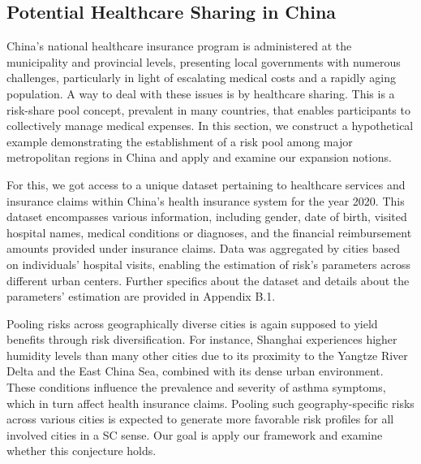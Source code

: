 \documentclass[fleqn,mnsc,nonblindrev]{informs4}
\begin{document}

\subsection{Potential Healthcare Sharing in China}

China's national healthcare insurance program is administered at the municipality and provincial levels, presenting local governments with numerous challenges, particularly in light of escalating medical costs and a rapidly aging population. A way to deal with these issues is by healthcare sharing. This is a risk-share pool concept, prevalent in many countries, that enables participants to collectively manage medical expenses. In this section, we construct a hypothetical example demonstrating the establishment of a risk pool among major metropolitan regions in China and apply and examine our expansion notions.  

For this, we got access to a unique dataset pertaining to healthcare services and insurance claims within China’s health insurance system for the year 2020. This dataset encompasses various information, including gender, date of birth, visited hospital names, medical conditions or diagnoses, and the financial reimbursement amounts provided under insurance claims. Data was aggregated by cities based on individuals' hospital visits, enabling the estimation of risk's parameters across different urban centers. Further specifics about the dataset and details about the parameters' estimation are provided in Appendix B.1.%

Pooling risks across geographically diverse cities is again supposed to yield benefits through risk diversification. For instance, Shanghai experiences higher humidity levels than many other cities due to its proximity to the Yangtze River Delta and the East China Sea, combined with its dense urban environment. These conditions influence the prevalence and severity of asthma symptoms, which in turn affect health insurance claims. Pooling such geography-specific risks across various cities is expected to generate more favorable risk profiles for all involved cities in a SC sense. Our goal is apply our framework and examine whether this conjecture holds. 
\end{document}
